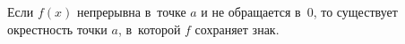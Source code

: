 \label{A2f}
Если $f(x)$ непрерывна в~точке $a$ и не обращается в~$0$, то существует окрестность точки $a$, в~которой $f$ сохраняет знак.

